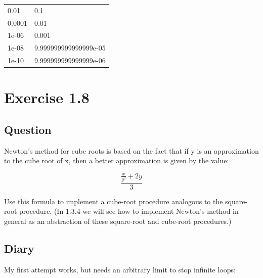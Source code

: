 \documentclass[
]{article}
\begin{document}
\begin{longtable}[]{@{}ll@{}}
\toprule
\endhead
0.01 & 0.1 \\
0.0001 & 0.01 \\
1e-06 & 0.001 \\
1e-08 & 9.999999999999999e-05 \\
1e-10 & 9.999999999999999e-06 \\
\bottomrule
\end{longtable}

\hypertarget{exercise-1.8}{%
\section{Exercise 1.8}\label{exercise-1.8}}

\hypertarget{question-7}{%
\subsection{Question}\label{question-7}}

Newton's method for cube roots is based on the fact that if y is an
approximation to the cube root of x, then a better approximation is
given by the value:

\begin{equation}
\frac{\frac{x}{y^2} + 2y}{3}
\end{equation}

Use this formula to implement a cube-root procedure analogous to the
square-root procedure. (In 1.3.4 we will see how to implement Newton's
method in general as an abstraction of these square-root and cube-root
procedures.)

\hypertarget{diary-1}{%
\subsection{Diary}\label{diary-1}}

My first attempt works, but needs an arbitrary limit to stop infinite
loops:
\end{document}
